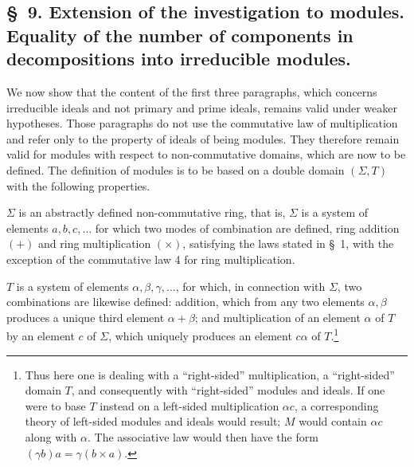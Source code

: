 \documentclass[11pt]{article}
\begin{document}
\setcounter{footnote}{34}

\subsection*{\S~9. Extension of the investigation to modules. Equality of the number of components in decompositions into irreducible modules.}

We now show that the content of the first three paragraphs, which concerns irreducible ideals and not primary and prime ideals, remains valid under weaker hypotheses. Those paragraphs do not use the commutative law of multiplication and refer only to the property of ideals of being modules. They therefore remain valid for modules with respect to non-commutative domains, which are now to be defined. The definition of modules is to be based on a double domain $(\Sigma,T)$ with the following properties.

$\Sigma$ is an abstractly defined non-commutative ring, that is, $\Sigma$ is a system of elements $a,b,c,\ldots$ for which two modes of combination are defined, ring addition $(+)$ and ring multiplication $(\times)$, satisfying the laws stated in \S~1, with the exception of the commutative law 4 for ring multiplication.

$T$ is a system of elements $\alpha,\beta,\gamma,\ldots$, for which, in connection with $\Sigma$, two combinations are likewise defined: addition, which from any two elements $\alpha,\beta$ produces a unique third element $\alpha+\beta$; and multiplication of an element $\alpha$ of $T$ by an element $c$ of $\Sigma$, which uniquely produces an element $c\alpha$ of $T$.\footnote{Thus here one is dealing with a ``right-sided'' multiplication, a ``right-sided'' domain $T$, and consequently with ``right-sided'' modules and ideals. If one were to base $T$ instead on a left-sided multiplication $\alpha c$, a corresponding theory of left-sided modules and ideals would result; $M$ would contain $\alpha c$ along with $\alpha$. The associative law would then have the form $(\gamma b)a=\gamma(b\times a)$.}
\end{document}
